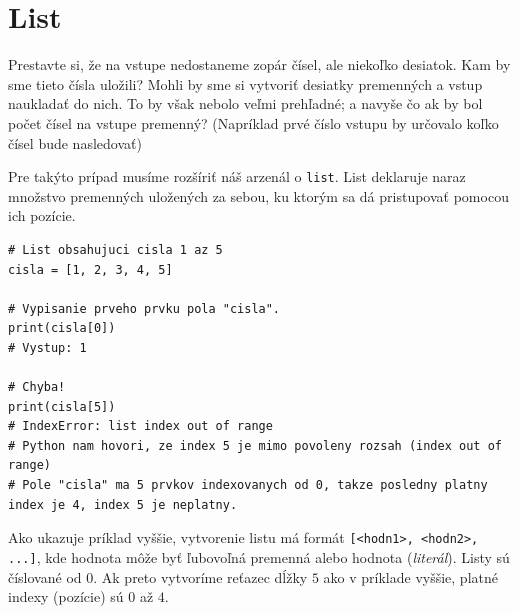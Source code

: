 \documentclass{article}
\begin{document}
\section{List}

Prestavte si, že na vstupe nedostaneme zopár čísel, ale niekoľko desiatok. Kam by sme tieto čísla uložili? Mohli by sme si vytvoriť desiatky premenných a vstup naukladať do nich. To by však nebolo veľmi prehľadné; a navyše čo ak by bol počet čísel na vstupe premenný? (Napríklad prvé číslo vstupu by určovalo koľko čísel bude nasledovať)

Pre takýto prípad musíme rozšíriť náš arzenál o \texttt{list}. List deklaruje naraz množstvo premenných uložených za sebou, ku ktorým sa dá pristupovať pomocou ich pozície.
\begin{lstlisting}
# List obsahujuci cisla 1 az 5
cisla = [1, 2, 3, 4, 5]

# Vypisanie prveho prvku pola "cisla".
print(cisla[0])
# Vystup: 1

# Chyba!
print(cisla[5])
# IndexError: list index out of range
# Python nam hovori, ze index 5 je mimo povoleny rozsah (index out of range)
# Pole "cisla" ma 5 prvkov indexovanych od 0, takze posledny platny index je 4, index 5 je neplatny.
\end{lstlisting}

Ako ukazuje príklad vyššie, vytvorenie listu má formát \texttt{[<hodn1>, <hodn2>, ...]}, kde hodnota môže byť ľubovoľná premenná alebo hodnota (\textit{literál}). Listy sú číslované od $0$. Ak preto vytvoríme reťazec dĺžky $5$ ako v príklade vyššie, platné indexy (pozície) sú $0$ až $4$. 
\end{document}
